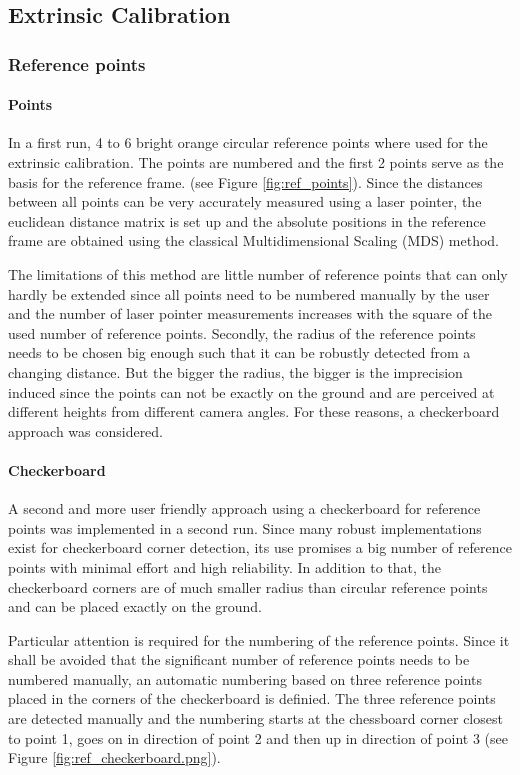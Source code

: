 \subsection{Extrinsic Calibration}
\label{sec:extrinsic}
\subsubsection{Reference points}

\paragraph{Points} 
In a first run, 4 to 6 bright orange circular reference points where used for the extrinsic calibration. The points are numbered and the first 2 points serve as the basis for the reference frame. (see Figure \ref{fig:ref_points}).
Since the distances between all points can be very accurately measured using a laser pointer, the euclidean distance matrix is set up and the absolute positions in the reference frame are obtained using the classical Multidimensional Scaling (MDS) method. \cite{Wickelmaier2003}

The limitations of this method are little number of reference points that can only hardly be extended since all points need to be numbered manually by the user and the number of laser pointer measurements increases with the square of the used number of reference points.
Secondly, the radius of the reference points needs to be chosen big enough such that it can be robustly detected from a changing distance. But the bigger the radius, the bigger is the imprecision induced since the points can not be exactly on the ground and are perceived at different heights from different camera angles.
For these reasons, a checkerboard approach was considered.

\paragraph{Checkerboard}
A second and more user friendly approach using a checkerboard for reference points was implemented in a second run. 
Since many robust implementations exist for checkerboard corner detection, its use promises a big number of reference points with minimal effort and high reliability. 
In addition to that, the checkerboard corners are of much smaller radius than circular reference points and can be placed exactly on the ground.

Particular attention is required for the numbering of the reference points. 
Since it shall be avoided that the significant number of reference points needs to be numbered manually, an automatic numbering based on three reference points placed in the corners of the checkerboard is definied. 
The three reference points are detected manually and the numbering starts at the chessboard corner closest to point 1, goes on in direction of point 2 and then up in direction of point 3 (see Figure \ref{fig:ref_checkerboard.png}).

